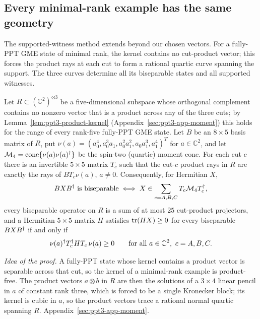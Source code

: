 \subsection{Every minimal-rank example has the same geometry}\label{sec:ppt3-moment-cone}

The supported-witness method extends beyond our chosen vectors. For a fully-PPT GME state of minimal rank, the kernel contains no cut-product
vector; this forces the product rays at each cut to form a rational quartic curve spanning the support.
The three curves determine all its biseparable states and all supported witnesses.

\begin{theorem}\label{thm:ppt3-universal-moments}
Let $R\subset(\mathbb C^2)^{\otimes3}$ be a five-dimensional subspace whose orthogonal complement contains no nonzero vector
that is a product across any of the three cuts; by Lemma~\ref{lem:ppt3-product-kernel} (Appendix~\ref{sec:ppt3-app-moment}) this holds for the range of every
rank-five fully-PPT GME state. Let $B$ be an $8\times5$ basis matrix of $R$, put $\nu(a)=(a_0^4,a_0^3a_1,a_0^2a_1^2,
a_0a_1^3,a_1^4)^T$ for $a\in\mathbb C^2$, and let $\mathcal M_4=\operatorname{cone}\{\nu(a)\nu(a)^{\dagger}\}$ be the spin-two
(quartic) moment cone. For each cut $c$ there is an invertible $5\times5$ matrix $T_c$ such that the cut-$c$ product
rays in $R$ are exactly the rays of $BT_c\nu(a)$, $a\neq0$. Consequently, for Hermitian $X$,
\begin{equation}\label{eq:ppt3-universal-bs}
 BXB^{\dagger}\ \text{is biseparable}\iff X\in\sum_{c=A,B,C}T_c\mathcal M_4T_c^{\dagger} ,
\end{equation}
every biseparable operator on $R$ is a sum of at most $25$ cut-product projectors, and a Hermitian $5\times5$ matrix $H$
satisfies $\operatorname{tr}(HX)\ge0$ for every biseparable $BXB^{\dagger}$ if and only if
\begin{equation}\label{eq:ppt3-universal-dual}
 \nu(a)\dg T_c\dg HT_c\,\nu(a)\ge0\qquad\text{for all }a\in\mathbb C^2,\ c=A,B,C .
\end{equation}
\end{theorem}

\emph{Idea of the proof.} A fully-PPT state whose kernel contains a product vector is separable across that cut, so the
kernel of a minimal-rank example is product-free. The product vectors $a\otimes b$ in $R$ are then the solutions of a
$3\times4$ linear pencil in $a$ of constant rank three, which is forced to be a single Kronecker block; its kernel is
cubic in $a$, so the product vectors trace a rational normal quartic spanning $R$. Appendix~\ref{sec:ppt3-app-moment}.

